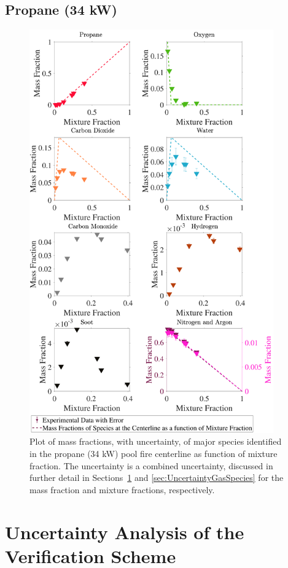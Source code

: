 \documentclass[12pt]{article}
\begin{document}
\subsection{Propane (34 kW)}
\label{ssec:Propane34KW_ALL_Mix_Frac}
\begin{figure}[!h]
	\centering
\includegraphics[width=10.5cm,keepaspectratio]{Propane 34KW_Mixture_Fraction_Major_Plot.pdf}
	\caption[Species mass fractions superimposed on propane (20 kW) state relations]{Plot of mass fractions, with uncertainty, of major species identified in the propane (34 kW) pool fire centerline as function of mixture fraction. The uncertainty is a combined uncertainty, discussed in further detail in Sections~\ref{sec:Uncertainty_Ver_Scheme} and \ref{sec:UncertaintyGasSpecies} for the mass fraction and mixture fractions, respectively.}
	\label{fig:Propane34KW_MIX_Frac_Major}
\end{figure}

\pagebreak

\section{Uncertainty Analysis of the Verification Scheme}\label{sec:Uncertainty_Ver_Scheme}
\end{document}
